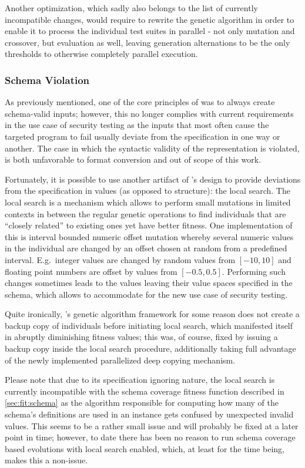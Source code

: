 Another optimization, which sadly also belongs to the list of currently incompatible changes, would require to
rewrite the genetic algorithm in order to enable it to process the individual test suites in parallel -
not only mutation and crossover, but evaluation as well, leaving generation alternations to be the only
thresholds to otherwise completely parallel execution.
\subsubsection{Schema Violation}
\label{sec:local}
As previously mentioned, one of the core principles of \xmlmate was to always create schema-valid inputs; 
however, this no longer complies with current requirements in the use case of security testing as the 
inputs that most often cause the targeted program to fail usually deviate from the specification in 
one way or another. The case in which the syntactic validity of the \xml representation is violated, is 
both unfavorable to format conversion and out of scope of this work.

Fortunately, it is possible to use another artifact of \evosuite's design to provide deviations from the 
specification in values (as opposed to structure): the local search. 
The local search is a mechanism which allows to perform small mutations in limited contexts in between 
the regular genetic operations to find individuals that are ``closely related'' to existing ones
yet have better fitness. One implementation of this is interval bounded numeric offset mutation whereby
several numeric values in the individual are changed by an offset chosen at random from a predefined 
interval. E.g.\ integer values are changed by random values from $[-10,10]$ and floating point numbers 
are offset by values from $[-0.5,0.5]$.
Performing such changes sometimes leads to the values leaving their value spaces specified in the schema, 
which allows to accommodate for the new use case of security testing.

Quite ironically, \evosuite's genetic algorithm framework for some reason does not create a backup 
copy of individuals before initiating local search, which manifested itself in abruptly diminishing 
fitness values; this was, of course, fixed by issuing a backup copy inside the local search procedure, 
additionally taking full advantage of the newly implemented parallelized deep copying mechanism.

Please note that due to its specification ignoring nature, the local search is currently incompatible with the
schema coverage fitness function described in \cref{sec:fit:schema} as the algorithm responsible for computing
how many of the schema's definitions are used in an \xml instance gets confused by unexpected invalid values.
This seems to be a rather small issue and will probably be fixed at a later point in time; however, to date
there has been no reason to run schema coverage based evolutions with local search enabled, which, at least for
the time being, makes this a non-issue.
